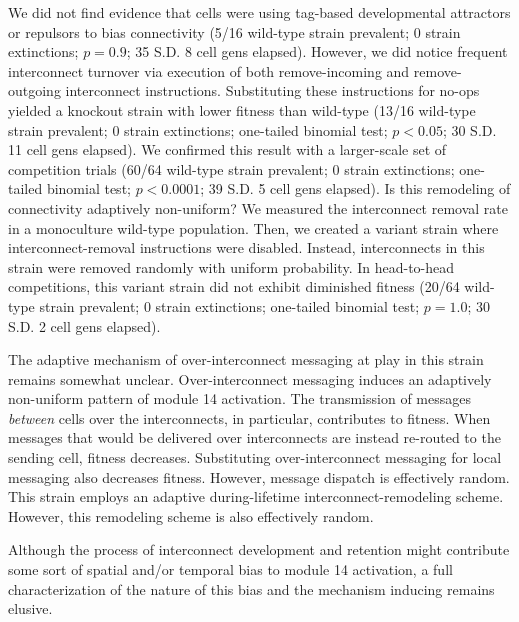 We did not find evidence that cells were using tag-based developmental attractors or repulsors to bias connectivity (5/16 wild-type strain prevalent; 0 strain extinctions; $p=0.9$; 35 S.D. 8 cell gens elapsed).
However, we did notice frequent interconnect turnover via execution of both remove-incoming and remove-outgoing interconnect instructions.
Substituting these instructions for no-ops yielded a knockout strain with lower fitness than wild-type (13/16 wild-type strain prevalent; 0 strain extinctions; one-tailed binomial test; $p < 0.05$; 30 S.D. 11 cell gens elapsed).
We confirmed this result with a larger-scale set of competition trials (60/64 wild-type strain prevalent; 0 strain extinctions; one-tailed binomial test; $p < 0.0001$; 39 S.D. 5 cell gens elapsed).
Is this remodeling of connectivity adaptively non-uniform?
We measured the interconnect removal rate in a monoculture wild-type population.
Then, we created a variant strain where interconnect-removal instructions were disabled.
Instead, interconnects in this strain were removed randomly with uniform probability.
In head-to-head competitions, this variant strain did not exhibit diminished fitness (20/64 wild-type strain prevalent; 0 strain extinctions; one-tailed binomial test; $p = 1.0$; 30 S.D. 2 cell gens elapsed).

The adaptive mechanism of over-interconnect messaging at play in this strain remains somewhat unclear.
Over-interconnect messaging induces an adaptively non-uniform pattern of module 14 activation.
The transmission of messages \textit{between} cells over the interconnects, in particular, contributes to fitness.
When messages that would be delivered over interconnects are instead re-routed to the sending cell, fitness decreases.
Substituting over-interconnect messaging for local messaging also decreases fitness.
However, message dispatch is effectively random.
This strain employs an adaptive during-lifetime interconnect-remodeling scheme.
However, this remodeling scheme is also effectively random.

Although the process of interconnect development and retention might contribute some sort of spatial and/or temporal bias to module 14 activation, a full characterization of the nature of this bias and the mechanism inducing remains elusive.
